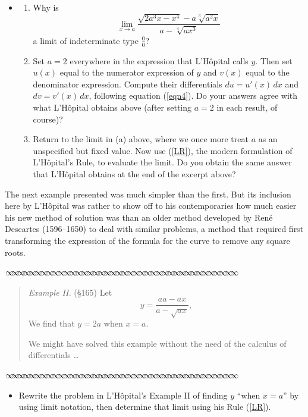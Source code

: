 \documentclass[11pt]{article}
\newcommand{\sep}{\vspace{-3pt}
\begin{center}
{\mathversion{normal}
$\infty \mspace{-5.5mu}\infty \mspace{-5.5mu}\infty \mspace{-5.5mu}\infty \mspace{-5.5mu}
\infty \mspace{-5.5mu}\infty \mspace{-5.5mu}\infty \mspace{-5.5mu}\infty \mspace{-5.5mu}
\infty \mspace{-5.5mu}\infty \mspace{-5.5mu}\infty \mspace{-5.5mu}\infty \mspace{-5.5mu}
\infty \mspace{-5.5mu}\infty \mspace{-5.5mu}\infty \mspace{-5.5mu}\infty \mspace{-5.5mu}
\infty \mspace{-5.5mu}\infty \mspace{-5.5mu}\infty \mspace{-5.5mu}\infty \mspace{-5.5mu}
\infty \mspace{-5.5mu}\infty \mspace{-5.5mu}\infty \mspace{-5.5mu}\infty \mspace{-5.5mu}
\infty \mspace{-5.5mu}\infty \mspace{-5.5mu}\infty \mspace{-5.5mu}\infty \mspace{-5.5mu}
\infty \mspace{-5.5mu}\infty \mspace{-5.5mu}\infty \mspace{-5.5mu}\infty \mspace{-5.5mu}
\infty \mspace{-5.5mu}\infty \mspace{-5.5mu}\infty \mspace{-5.5mu}\infty \mspace{-5.5mu}
\infty \mspace{-5.5mu}\infty \mspace{-5.5mu}\infty \mspace{-5.5mu}\infty \mspace{-5.5mu}$}
\end{center} \vspace*{-5pt}}
\newenvironment{source}%
 {\bigskip \sep \vspace*{-6pt} \begin{quote}
          \begin{sf}   }
   {   \end{sf}     \end{quote} \vspace*{-6pt} \sep \bigskip}%
\newcounter{tasknumb}
\newcommand{\tasknumb}[1]{\refstepcounter{tasknumb}\textmd{\textbf{$\fbox{$\fbox{Task \thetasknumb}$}$}}#1}
\newenvironment{task}[1][]%
 {\begin{itemize}
 \item[\tasknumb{#1}] }
{
    \end{itemize}    }%
\begin{document}
\begin{task}[\label{ex1}]
\begin{enumerate}
\item[(a)] Why is $$\lim_{x\to a} \frac{\sqrt{2a^3x-x^4}-a\sqrt[3]{a^2x}}{a-\sqrt[4]{ax^3}}$$a limit of indeterminate type $\frac00$? \\
\item[(b)] Set $a=2$ everywhere in the expression that L'H\^opital calls $y$. Then set $u(x)$ equal to the numerator expression of $y$ and $v(x)$ equal to the denominator expression. Compute their differentials $du=u'(x)\,dx$ and $dv=v'(x)\,dx$, following equation (\ref{eqn4}). Do your answers agree with what L'H\^opital obtains above (after setting $a=2$ in each result, of course)? \\
\item[(c)] Return to the limit in (a) above, where we once more treat $a$ as an unspecified but fixed value. Now use (\ref{LR}), the modern formulation of L'H\^opital's Rule, to evaluate the limit. Do you obtain the same answer that L'H\^opital obtains at the end of the excerpt above?
\end{enumerate}

\end{task}

\bigskip
The next example presented was much simpler than the first. But its inclusion here by L'H\^opital was rather to show off to his contemporaries how much easier his new method of solution was than an older method developed by Ren\'e Descartes (1596--1650) to deal with similar problems, a method that required first transforming the expression of the formula for the curve to remove any square roots.

\begin{source}
\emph{Example II.} (\S 165) Let $$y=\frac{aa-ax}{a-\sqrt{ax}},$$We find that $y=2a$ when $x=a$. 

We might have solved this example without the need of the calculus of differentials \dots


\end{source}

\begin{task}[\label{ex2}]
Rewrite the problem in L'H\^opital's {\sf Example II} of finding $y$ ``{\sf when} $x=a$'' by using limit notation, then determine that limit using his Rule (\ref{LR}).

\end{task}
\end{document}
